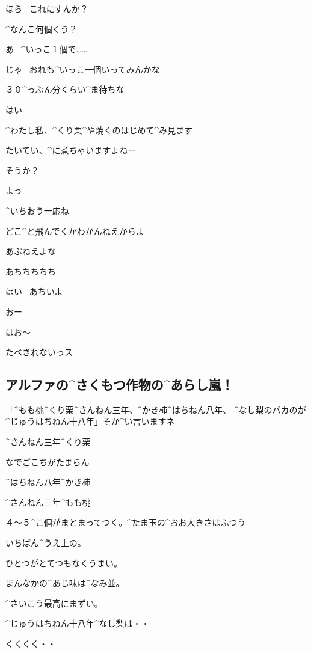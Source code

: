 \Person ほら
\ これにすんか？

\Person ^{なんこ}{何個}くう？

\Alpha あ
\ ^{いっこ}{１個}で……

\page
\Person じゃ
\ おれも^{いっこ}{一個}いってみんかな

\Person ３０^{っぷん}{分}くらい^{ま}{待}ちな

\Alpha はい

\Alpha ^{わたし}{私}、^{くり}{栗}^{や}{焼}くのはじめて^{み}{見}ます

\Alpha たいてい、^{に}{煮}ちゃいますよねー

\Person そうか？

\page
\Person よっ

\Person ^{いちおう}{一応}ね

\page[154]
\Person どこ^{と}{飛}んでくかわかんねえからよ

\Person あぶねえよな

\Person あちちちちち

\Person ほい
\ あちいよ

\Alpha おー

\Alpha はお〜

\page[157]
\Sign たべきれないっス


\subsection{アルファの^{さくもつ}{作物}の^{あらし}{嵐}！}
\Alpha 「^{もも}{桃}^{くり}{栗}^{さんねん}{三年}、^{かき}{柿}^{はちねん}{八年}、
  ^{なし}{梨}のバカのが^{じゅうはちねん}{十八年}」そか^{い}{言}いますネ

\Sign ^{さんねん}{三年}^{くり}{栗}

\Alpha なでごこちがたまらん

\Sign ^{はちねん}{八年}^{かき}{柿}

\Sign ^{さんねん}{三年}^{もも}{桃}

\Alpha ４〜５^{こ}{個}がまとまってつく。^{たま}{玉}の^{おお}{大}きさはふつう

\Alpha いちばん^{うえ}{上}の。

\Alpha ひとつがとてつもなくうまい。

\Alpha まんなかの^{あじ}{味}は^{なみ}{並}。

\Alpha ^{さいこう}{最高}にまずい。

\Sign ^{じゅうはちねん}{十八年}^{なし}{梨}は・・

\Alpha くくくく・・
